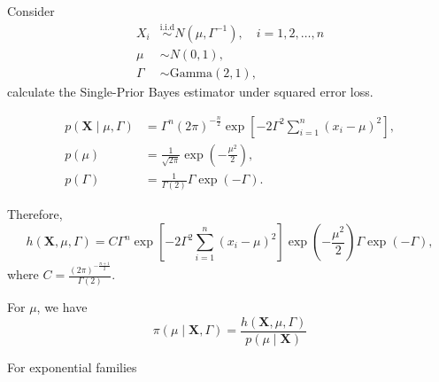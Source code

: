 \begin{example}
    Consider
    \begin{equation*}
        \begin{aligned}
            X_i    & \stackrel{\text{i.i.d}}{\sim}N(\mu,\Gamma^{-1}),\quad i=1,2,\ldots,n \\
            \mu    & \sim N(0,1),                                                         \\
            \Gamma & \sim\text{Gamma}(2,1),
        \end{aligned}
    \end{equation*}
    calculate the Single-Prior Bayes estimator under squared error loss.
\end{example}

\begin{solution}
    \begin{equation*}
        \begin{aligned}
            p\left(\textbf{X}\mid\mu,\Gamma\right) & =\Gamma^n(2\pi)^{-\frac{n}{2}}\exp\left[-2\Gamma^2\sum_{i=1}^{n}(x_i-\mu)^2\right], \\
            p(\mu)                                 & =\frac{1}{\sqrt{2\pi}}\exp\left(-\frac{\mu^2}{2}\right),                            \\
            p(\Gamma)                              & =\frac{1}{\Gamma(2)}\Gamma\exp\left(-\Gamma\right).
        \end{aligned}
    \end{equation*}

    Therefore,
    \begin{equation*}
        h\left(\textbf{X},\mu,\Gamma\right)=C\Gamma^n\exp\left[-2\Gamma^2\sum_{i=1}^{n}(x_i-\mu)^2\right]\exp\left(-\frac{\mu^2}{2}\right)\Gamma\exp\left(-\Gamma\right),
    \end{equation*}
    where $C=\frac{(2\pi)^{-\frac{n+1}{2}}}{\Gamma(2)}$.

    For $\mu$, we have
    \begin{equation*}
        \pi\left(\mu\mid\textbf{X},\Gamma\right)=\frac{h\left(\textbf{X},\mu,\Gamma\right)}{p(\mu\mid\textbf{X})}
    \end{equation*}
\end{solution}

For exponential families

\begin{theorem}

\end{theorem}

